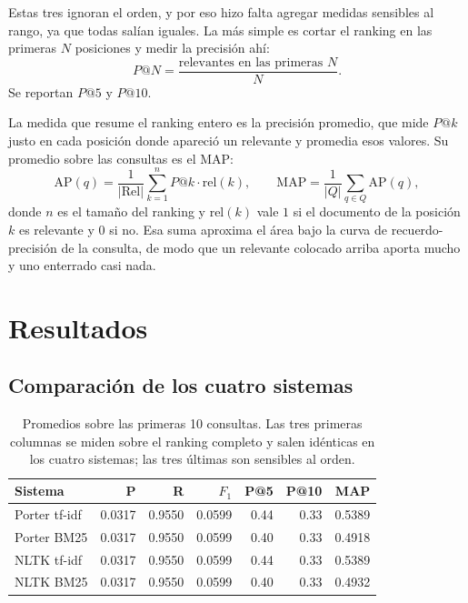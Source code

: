\documentclass[11pt,letterpaper]{article}
\begin{document}
Estas tres ignoran el orden, y por eso hizo falta agregar medidas
sensibles al rango, ya que todas salían iguales. 
La más simple es cortar el ranking en las primeras
$N$ posiciones y medir la precisión ahí:
\[
    P@N = \frac{\text{relevantes en las primeras } N}{N} .
\]
Se reportan $P@5$ y $P@10$.

La medida que resume el ranking entero es la precisión promedio, que
mide $P@k$ justo en cada posición donde apareció un relevante y
promedia esos valores. Su promedio sobre las consultas es el MAP:
\[
    \mathrm{AP}(q) = \frac{1}{|\mathrm{Rel}|} \sum_{k=1}^{n}
                     P@k \cdot \mathrm{rel}(k) ,
    \qquad
    \mathrm{MAP} = \frac{1}{|Q|} \sum_{q \in Q} \mathrm{AP}(q) ,
\]
donde $n$ es el tamaño del ranking y $\mathrm{rel}(k)$ vale $1$ si el
documento de la posición $k$ es relevante y $0$ si no. Esa suma
aproxima el área bajo la curva de recuerdo-precisión de la consulta,
de modo que un relevante colocado arriba aporta mucho y uno enterrado
casi nada.

\section{Resultados}

\subsection*{Comparación de los cuatro sistemas}

\begin{table}[H]
  \centering
  \begin{tabular}{lrrrrrr}
    \toprule
    \textbf{Sistema} & \textbf{P} & \textbf{R} & \textbf{$F_1$}
      & \textbf{P@5} & \textbf{P@10} & \textbf{MAP} \\
    \midrule
    Porter tf-idf & 0.0317 & 0.9550 & 0.0599 & 0.44 & 0.33 & 0.5389 \\
    Porter BM25   & 0.0317 & 0.9550 & 0.0599 & 0.40 & 0.33 & 0.4918 \\
    NLTK tf-idf   & 0.0317 & 0.9550 & 0.0599 & 0.44 & 0.33 & 0.5389 \\
    NLTK BM25     & 0.0317 & 0.9550 & 0.0599 & 0.40 & 0.33 & 0.4932 \\
    \bottomrule
  \end{tabular}
  \caption{Promedios sobre las primeras 10 consultas. Las tres
    primeras columnas se miden sobre el ranking completo y salen
    idénticas en los cuatro sistemas; las tres últimas son sensibles
    al orden.}
  \label{tab:sistemas}
\end{table}
\end{document}
